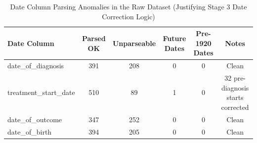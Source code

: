 \begin{table}[htbp]

\caption{Date Column Parsing Anomalies in the Raw Dataset (Justifying Stage 3 Date Correction Logic)}
\label{tab:date_anomaly_summary}
\begin{tabular}{lccccc}

\toprule

Date Column & Parsed OK & Unparseable & Future Dates & Pre-1920 Dates & Notes \\

\midrule

date\_of\_diagnosis & 391 & 208 & 0 & 0 & Clean \\
treatment\_start\_date & 510 & 89 & 1 & 0 & 32 pre-diagnosis starts corrected \\
date\_of\_outcome & 347 & 252 & 0 & 0 & Clean \\
date\_of\_birth & 394 & 205 & 0 & 0 & Clean \\

\bottomrule

\end{tabular}

\end{table}
